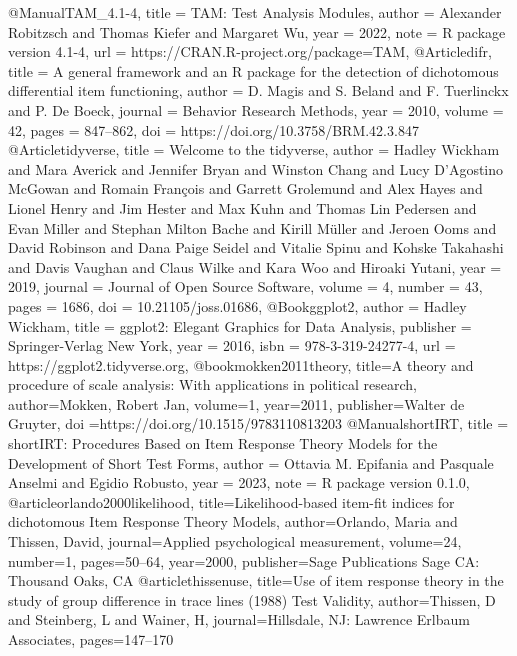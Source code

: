     @Manual{TAM_4.1-4,
    title = {TAM: Test Analysis Modules},
    author = {Alexander Robitzsch and Thomas Kiefer and Margaret Wu},
    year = {2022},
    note = {R package version 4.1-4},
    url = {https://CRAN.R-project.org/package=TAM},
  }
    @Article{difr,
    title = {A general framework and an R package for the detection of dichotomous differential item functioning},
    author = {D. Magis and S. Beland and F. Tuerlinckx and P. {De Boeck}},
    journal = {Behavior Research Methods},
    year = {2010},
    volume = {42},
    pages = {847--862},
    doi = {https://doi.org/10.3758/BRM.42.3.847}
  }
    @Article{tidyverse,
    title = {Welcome to the {tidyverse}},
    author = {Hadley Wickham and Mara Averick and Jennifer Bryan and Winston Chang and Lucy D'Agostino McGowan and Romain François and Garrett Grolemund and Alex Hayes and Lionel Henry and Jim Hester and Max Kuhn and Thomas Lin Pedersen and Evan Miller and Stephan Milton Bache and Kirill Müller and Jeroen Ooms and David Robinson and Dana Paige Seidel and Vitalie Spinu and Kohske Takahashi and Davis Vaughan and Claus Wilke and Kara Woo and Hiroaki Yutani},
    year = {2019},
    journal = {Journal of Open Source Software},
    volume = {4},
    number = {43},
    pages = {1686},
    doi = {10.21105/joss.01686},
  }
    @Book{ggplot2,
    author = {Hadley Wickham},
    title = {ggplot2: Elegant Graphics for Data Analysis},
    publisher = {Springer-Verlag New York},
    year = {2016},
    isbn = {978-3-319-24277-4},
    url = {https://ggplot2.tidyverse.org},
  }
  @book{mokken2011theory,
  title={A theory and procedure of scale analysis: With applications in political research},
  author={Mokken, Robert Jan},
  volume={1},
  year={2011},
  publisher={Walter de Gruyter}, 
  doi ={https://doi.org/10.1515/9783110813203}
}
  @Manual{shortIRT,
    title = {shortIRT: Procedures Based on Item Response Theory Models for the
Development of Short Test Forms},
    author = {Ottavia M. Epifania and Pasquale Anselmi and Egidio Robusto},
    year = {2023},
    note = {R package version 0.1.0},
  }
  @article{orlando2000likelihood,
  title={{Likelihood-based item-fit indices for dichotomous Item Response Theory Models}},
  author={Orlando, Maria and Thissen, David},
  journal={Applied psychological measurement},
  volume={24},
  number={1},
  pages={50--64},
  year={2000},
  publisher={Sage Publications Sage CA: Thousand Oaks, CA}
}
@article{thissenuse,
  title={Use of item response theory in the study of group difference in trace lines (1988) Test Validity},
  author={Thissen, D and Steinberg, L and Wainer, H},
  journal={Hillsdale, NJ: Lawrence Erlbaum Associates},
  pages={147--170}
}
